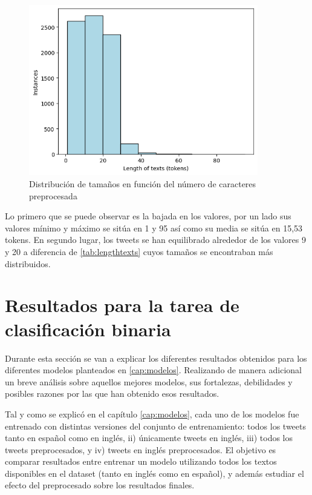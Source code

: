 \begin{figure}[H]
    \centering
    \includegraphics[width=10cm]{imagenes/Evaluacion/dataset_study/preprocessed_text_lenght_tokens.png}
    \caption{\centering Distribución de tamaños en función del número de caracteres preprocesada}
\end{figure}

Lo primero que se puede observar es la bajada en los valores, por un lado sus valores mínimo y máximo se sitúa en 1 y 95 así como su media se sitúa en 15,53 tokens. En segundo lugar, los tweets se han equilibrado alrededor de los valores 9 y 20 a diferencia de \autoref{tab:lengthtexts} cuyos tamaños se encontraban más distribuidos.

\section{Resultados para la tarea de clasificación binaria}
Durante esta sección se van a explicar los diferentes resultados obtenidos para los diferentes modelos planteados en \autoref{cap:modelos}. Realizando de manera adicional un breve análisis sobre aquellos mejores modelos, sus fortalezas, debilidades y posibles razones por las que han obtenido esos resultados.

Tal y como se explicó en el capítulo \ref{cap:modelos}, cada uno de los modelos fue entrenado con distintas versiones del conjunto de entrenamiento: todos los tweets tanto en español como en inglés, ii) únicamente tweets en inglés, iii) todos los tweets preprocesados, y iv) tweets en inglés preprocesados. El objetivo es comparar resultados entre entrenar un modelo utilizando todos los textos disponibles en el dataset (tanto en inglés como en español), y además estudiar el efecto del preprocesado sobre los resultados finales. 

